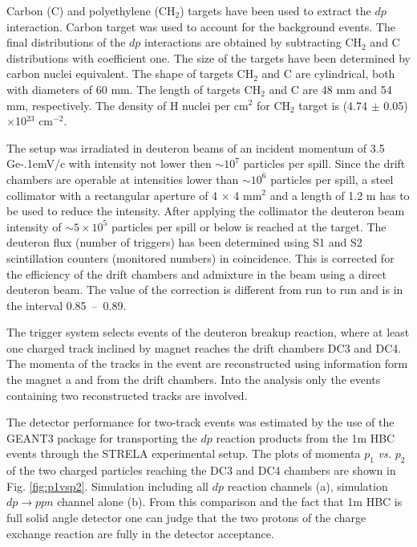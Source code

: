 \documentclass[twocolumn,epjc3]{svjour3}
\newcommand{\dpfrag} {\ensuremath{dp \rightarrow ppn}\xspace}
\newcommand{\dpchex} {\ensuremath{dp \rightarrow (pp)n}\xspace}
\newcommand{\GeVc}   {Ge\kern-.1emV/c\xspace}
\begin{document}
Carbon (C) and polyethylene (CH$_2$) targets have been used to extract the $dp$
interaction. Carbon target was used to account for the background events. The
final distributions of the $dp$ interactions are obtained by subtracting CH$_2$
and C distributions with coefficient one. The size of the targets have been
determined by carbon nuclei equivalent. The shape of targets CH$_2$ and C are
cylindrical, both with diameters of 60 mm. The length of targets CH$_2$ and C
are 48 mm and 54 mm, respectively. The density of H nuclei per cm$^2$ for CH$_2$
target is (4.74 $\pm$ 0.05)$\times$10$^{23}$ cm$^{-2}$.

The setup was irradiated in deuteron beams of an incident momentum of 3.5 \GeVc
with intensity not lower then $\sim 10^{7}$ particles per spill. Since the drift
chambers are operable at intensities lower than $\sim 10^{6}$ particles per
spill, a steel collimator with a rectangular aperture of 4 $\times$ 4 mm$^2$ and
a length of 1.2 m has to be used to reduce the intensity. After applying the
collimator the deuteron beam intensity of $\sim 5\times10^5$ particles per spill
or below is reached at the target. The deuteron flux (number of triggers) has
been determined using S1 and S2 scintillation counters (monitored numbers) in
coincidence. This is corrected for the efficiency of the drift chambers and
admixture in the beam using a direct deuteron beam. The value of the correction
is different from run to run and is in the interval 0.85~--~0.89.

The trigger system selects events of the deuteron breakup reaction, where at
least one charged track inclined by magnet reaches the drift chambers DC3 and
DC4. The momenta of the tracks in the event are reconstructed using information
form the magnet a and from the drift chambers. %
Into the analysis only the events containing two reconstructed tracks are
involved.

The detector performance for two-track events was estimated by the use of the
GEANT3 package for transporting the $dp$ reaction products from the 1m HBC
events through the STRELA experimental setup. The plots of momenta $p_1$
\textit{vs.}  $p_2$ of the two charged particles reaching the DC3 and DC4
chambers are shown in Fig. \ref{fig:p1vsp2}. Simulation including all $dp$
reaction channels (a), simulation \dpfrag channel alone (b). From this
comparison and the fact that 1m HBC is full solid angle detector one can judge
that the two protons of the charge exchange reaction are fully in the detector
acceptance.
\end{document}
